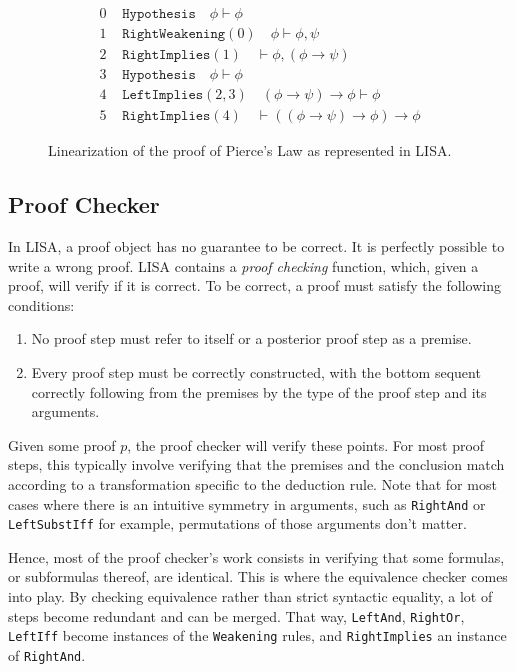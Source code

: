 \begin{figure}

\begin{equation}
\begin{split}
0 &\texttt { Hypothesis} \quad \phi \vdash \phi\\
1 &\texttt { RightWeakening}(0) \quad  \phi \vdash \phi, \psi\\
2 &\texttt { RightImplies}(1) \quad  \vdash \phi, (\phi \to \psi)\\
3 &\texttt { Hypothesis} \quad \phi \vdash \phi\\
4 &\texttt { LeftImplies}(2,3) \quad (\phi \to \psi) \to \phi \vdash \phi\\
5 &\texttt { RightImplies}(4) \quad \vdash ((\phi \to \psi) \to \phi) \to \phi
\end{split}
\end{equation}
    \caption{Linearization of the proof of Pierce's Law as represented in LISA.}
    \label{fig:exampleProofLinear}
\end{figure}

\subsection{Proof Checker}
\label{subs:proofchecker}

In LISA, a proof object has no guarantee to be correct. It is perfectly possible to write a wrong proof. LISA contains a \textit{proof checking} function, which, given a proof, will verify if it is correct. To be correct, a proof must satisfy the following conditions:
\begin{enumerate}
    \item No proof step must refer to itself or a posterior proof step as a premise.
    \item Every proof step must be correctly constructed, with the bottom sequent correctly following from the premises by the type of the proof step and its arguments.
\end{enumerate}


Given some proof $p$, the proof checker will verify these points. For most proof steps, this typically involve verifying that the premises and the conclusion match according to a transformation specific to the deduction rule. Note that for most cases where there is an intuitive symmetry in arguments, such as \texttt{RightAnd} or \texttt{LeftSubstIff} for example, permutations of those arguments don't matter.

Hence, most of the proof checker's work consists in verifying that some formulas, or subformulas thereof, are identical. This is where the equivalence checker comes into play. By checking equivalence rather than strict syntactic equality, a lot of steps become redundant and can be merged. That way, \texttt{LeftAnd}, \texttt{RightOr}, \texttt{LeftIff} become instances of the \texttt{Weakening} rules, and \texttt{RightImplies} an instance of \texttt{RightAnd}. 

